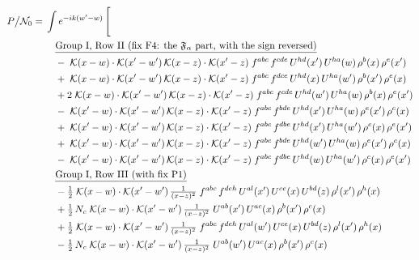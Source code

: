 \documentclass[10pt]{article}
\numberwithin{equation}{section}
\newcommand{\NO}{\mathcal N_0}
\begin{document}
\begin{align}
P\big/\NO={}&\int e^{-ik(w'-w)}\,\Bigg[\notag\\
&\quad\underline{\text{Group I, Row II (fix F4: the $\mathfrak F_\alpha$ part, with the sign reversed)}}\notag\\
&\quad -\;\mathcal{K}(x-w)\cdot\mathcal{K}(x'-w')\,\mathcal{K}(x-z)\cdot\mathcal{K}(x'-z)\;f^{abc}\,f^{cde}\,U^{hd}(x')\,U^{ha}(w)\,\rho^{b}(x)\,\rho^{e}(x')\notag\\
&\quad +\;\mathcal{K}(x-w)\cdot\mathcal{K}(x'-w')\,\mathcal{K}(x-z)\cdot\mathcal{K}(x'-z)\;f^{abc}\,f^{dce}\,U^{hd}(x)\,U^{ha}(w')\,\rho^{b}(x')\,\rho^{e}(x)\notag\\
&\quad +2\;\mathcal{K}(x-w)\cdot\mathcal{K}(x'-w')\,\mathcal{K}(x-z)\cdot\mathcal{K}(x'-z)\;f^{abc}\,f^{cde}\,U^{hd}(w')\,U^{ha}(w)\,\rho^{b}(x)\,\rho^{e}(x')\notag\\
&\quad -\;\mathcal{K}(x'-w)\cdot\mathcal{K}(x'-w')\,\mathcal{K}(x-z)\cdot\mathcal{K}(x'-z)\;f^{abc}\,f^{bde}\,U^{hd}(x')\,U^{ha}(w)\,\rho^{e}(x')\,\rho^{c}(x)\notag\\
&\quad +\;\mathcal{K}(x'-w)\cdot\mathcal{K}(x'-w')\,\mathcal{K}(x-z)\cdot\mathcal{K}(x'-z)\;f^{abc}\,f^{dbe}\,U^{hd}(x')\,U^{ha}(w')\,\rho^{c}(x)\,\rho^{e}(x')\notag\\
&\quad +\;\mathcal{K}(x'-w)\cdot\mathcal{K}(x'-w')\,\mathcal{K}(x-z)\cdot\mathcal{K}(x'-z)\;f^{abc}\,f^{bde}\,U^{hd}(w')\,U^{ha}(w)\,\rho^{e}(x')\,\rho^{c}(x)\notag\\
&\quad -\;\mathcal{K}(x'-w)\cdot\mathcal{K}(x'-w')\,\mathcal{K}(x-z)\cdot\mathcal{K}(x'-z)\;f^{abc}\,f^{dbe}\,U^{hd}(w)\,U^{ha}(w')\,\rho^{c}(x)\,\rho^{e}(x')\notag\\
&\quad\underline{\text{Group I, Row III (with fix P1)}}\notag\\
&\quad -\tfrac{1}{2}\;\mathcal{K}(x-w)\cdot\mathcal{K}(x'-w')\,\tfrac{1}{(x-z)^{2}}\;f^{abc}\,f^{deh}\,U^{al}(x')\,U^{ce}(x)\,U^{bd}(z)\,\rho^{l}(x')\,\rho^{h}(x)\notag\\
&\quad +\tfrac{1}{2}\,N_c\;\mathcal{K}(x-w)\cdot\mathcal{K}(x'-w')\,\tfrac{1}{(x-z)^{2}}\;U^{ab}(x')\,U^{ac}(x)\,\rho^{b}(x')\,\rho^{c}(x)\notag\\
&\quad +\tfrac{1}{2}\;\mathcal{K}(x-w)\cdot\mathcal{K}(x'-w')\,\tfrac{1}{(x-z)^{2}}\;f^{abc}\,f^{deh}\,U^{al}(w')\,U^{ce}(x)\,U^{bd}(z)\,\rho^{l}(x')\,\rho^{h}(x)\notag\\
&\quad -\tfrac{1}{2}\,N_c\;\mathcal{K}(x-w)\cdot\mathcal{K}(x'-w')\,\tfrac{1}{(x-z)^{2}}\;U^{ab}(w')\,U^{ac}(x)\,\rho^{b}(x')\,\rho^{c}(x)\notag\\

\end{align}
\end{document}

